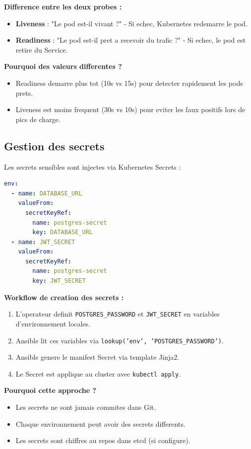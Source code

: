 \documentclass[12pt,a4paper,french]{report}
\begin{document}
\textbf{Difference entre les deux probes :}
\begin{itemize}
    \item \textbf{Liveness} : "Le pod est-il vivant ?" - Si echec, Kubernetes redemarre le pod.
    \item \textbf{Readiness} : "Le pod est-il pret a recevoir du trafic ?" - Si echec, le pod est retire du Service.
\end{itemize}

\textbf{Pourquoi des valeurs differentes ?}
\begin{itemize}
    \item Readiness demarre plus tot (10s vs 15s) pour detecter rapidement les pods prets.
    \item Liveness est moins frequent (30s vs 10s) pour eviter les faux positifs lors de pics de charge.
\end{itemize}

\subsection{Gestion des secrets}

Les secrets sensibles sont injectes via Kubernetes Secrets :

\begin{lstlisting}[language=yaml, caption=Injection des secrets]
env:
  - name: DATABASE_URL
    valueFrom:
      secretKeyRef:
        name: postgres-secret
        key: DATABASE_URL
  - name: JWT_SECRET
    valueFrom:
      secretKeyRef:
        name: postgres-secret
        key: JWT_SECRET
\end{lstlisting}

\textbf{Workflow de creation des secrets :}
\begin{enumerate}
    \item L'operateur definit \texttt{POSTGRES\_PASSWORD} et \texttt{JWT\_SECRET} en variables d'environnement locales.
    \item Ansible lit ces variables via \texttt{lookup('env', 'POSTGRES\_PASSWORD')}.
    \item Ansible genere le manifest Secret via template Jinja2.
    \item Le Secret est applique au cluster avec \texttt{kubectl apply}.
\end{enumerate}

\textbf{Pourquoi cette approche ?}
\begin{itemize}
    \item Les secrets ne sont jamais commites dans Git.
    \item Chaque environnement peut avoir des secrets differents.
    \item Les secrets sont chiffres au repos dans etcd (si configure).
\end{itemize}
\end{document}
